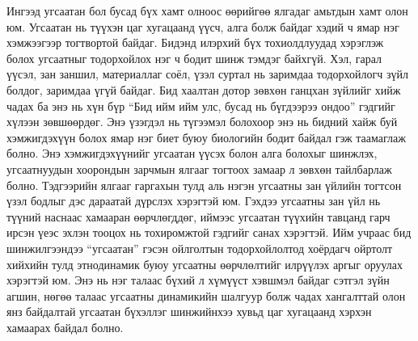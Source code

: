 Ингээд угсаатан бол бусад бүх хамт олноос өөрийгөө ялгадаг амьтдын хамт олон юм. Угсаатан нь түүхэн цаг хугацаанд үүсч, алга болж байдаг хэдий ч ямар нэг хэмжээгээр тогтвортой байдаг. Бидэнд илэрхий бүх тохиолдлуудад хэрэглэж болох угсаатныг тодорхойлох нэг ч бодит шинж тэмдэг байхгүй. Хэл, гарал үүсэл, зан заншил, материаллаг соёл, үзэл суртал нь заримдаа тодорхойлогч зүйл болдог, заримдаа үгүй байдаг. Бид хаалтан дотор зөвхөн ганцхан зүйлийг хийж чадах ба энэ нь хүн бүр “Бид ийм ийм улс, бусад нь бүгдээрээ ондоо” гэдгийг хүлээн зөвшөөрдөг. Энэ үзэгдэл нь түгээмэл болохоор энэ нь бидний хайж буй хэмжигдэхүүн болох ямар нэг биет буюу биологийн бодит байдал гэж таамаглаж болно. Энэ хэмжигдэхүүнийг угсаатан үүсэх болон алга болохыг шинжлэх, угсаатнуудын хоорондын зарчмын ялгааг тогтоох замаар л зөвхөн тайлбарлаж болно. Тэдгээрийн ялгааг гаргахын тулд аль нэгэн угсаатны зан үйлийн тогтсон үзэл бодлыг дэс дараатай дүрслэх хэрэгтэй юм. Гэхдээ угсаатны зан үйл нь түүний наснаас хамааран өөрчлөгддөг, иймээс угсаатан түүхийн тавцанд гарч ирсэн үеэс эхлэн тооцох нь тохиромжтой гэдгийг санах хэрэгтэй. Ийм учраас бид шинжилгээндээ “угсаатан” гэсэн ойлголтын тодорхойлолтод хоёрдагч ойртолт хийхийн тулд этнодинамик буюу угсаатны өөрчлөлтийг илрүүлэх аргыг оруулах хэрэгтэй юм. Энэ нь нэг талаас бүхий л хүмүүст хэвшмэл байдаг сэтгэл зүйн агшин, нөгөө талаас угсаатны динамикийн шалгуур болж чадах хангалттай олон янз байдалтай угсаатан бүхэллэг шинжийнхээ хувьд цаг хугацаанд хэрхэн хамаарах байдал болно.

